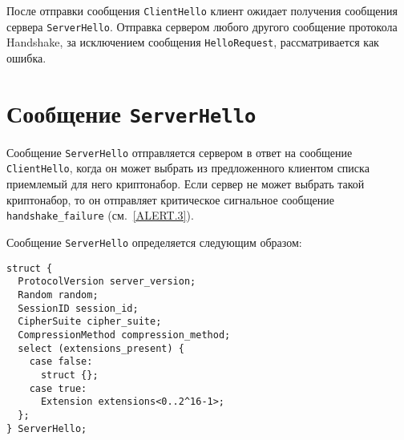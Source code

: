 После отправки сообщения \lstinline{ClientHello} клиент ожидает получения
сообщения сервера \lstinline{ServerHello}. Отправка сервером любого другого
сообщение протокола Handshake, за исключением сообщения
\lstinline{HelloRequest}, рассматривается как ошибка.

\section{Сообщение \lstinline{ServerHello}}\label{HANDSHAKE.6}

Сообщение \lstinline{ServerHello} отправляется сервером в ответ на сообщение 
\lstinline{ClientHello}, когда он может выбрать из предложенного клиентом списка 
приемлемый для него криптонабор. Если сервер не может выбрать такой 
криптонабор, то он отправляет критическое сигнальное сообщение 
\lstinline{handshake_failure} (см.~\ref{ALERT.3}). 

Сообщение \lstinline{ServerHello} определяется следующим образом:
\begin{lstlisting}
struct {
  ProtocolVersion server_version;
  Random random;
  SessionID session_id;
  CipherSuite cipher_suite;
  CompressionMethod compression_method;
  select (extensions_present) {
    case false:
      struct {};
    case true:
      Extension extensions<0..2^16-1>;
  };
} ServerHello;
\end{lstlisting}

